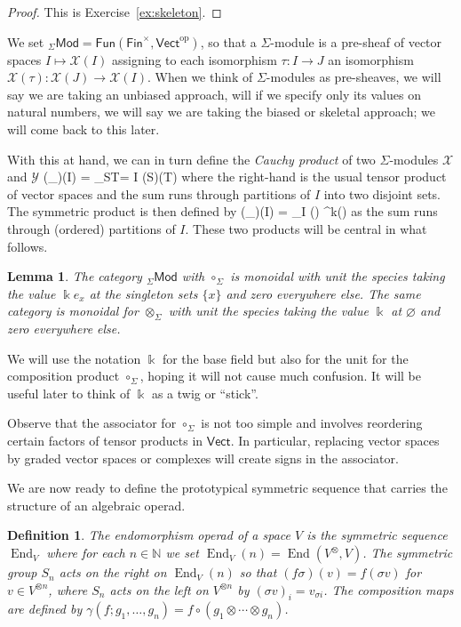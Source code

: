 \documentclass[fleqn, a4paper, twoside]{article}
\makeatletter
\newcommand{\0}{\langle 0\rangle}
\newcommand{\XX}{\mathcal{X}}
\newcommand{\YY}{\mathcal{Y}}
\newcommand{\End}{\operatorname{End}}
\let\[\@undefined
\DeclareRobustCommand{\[}{\begin{equation}}%
\let\]\@undefined
\DeclareRobustCommand{\]}{\end{equation}}%
\theoremstyle{mytheorem}
\newtheorem{lemma}[theorem]{Lemma}
\theoremstyle{introthm}
\theoremstyle{mydefinition}
\newtheorem{definition}[theorem]{Definition}
\theoremstyle{mydefinition2}
\theoremstyle{plain} %
\newcommand{\GSet}{\mathsf{Fin}^\times}
\newcommand{\Fun}{\mathsf{Fun}}
\newcommand{\Mod}{\mathsf{Mod}}
\newcommand{\?}{\,?\,}
\newcommand{\NN}{\mathbb N}
\newcommand{\kk}{\Bbbk}
\theoremstyle{mytheorem}
\theoremstyle{plain} %
\makeatother
\begin{document}
\begin{proof}
This is Exercise~\ref{ex:skeleton}.
\end{proof}

We set ${}_\Sigma\Mod  = 
\Fun(\GSet,\mathsf{Vect}^{\mathrm{op}})$,
so that a $\Sigma$-module is a pre-sheaf of vector
spaces $I\longmapsto \XX(I)$ assigning to each
isomorphism $\tau : I\longrightarrow J$ an isomorphism
$\XX(\tau): \XX(J)\longrightarrow \XX(I)$. When we
think of $\Sigma$-modules as pre-sheaves, we will say we 
are taking an unbiased approach, will if we specify only
its values on natural numbers, we will say we are taking the
biased or skeletal approach; we will come back to this later.

With this at hand, 
we can in turn define the \emph{Cauchy product}
of two $\Sigma$-modules $\XX$ and $\YY$
\[ (\XX\otimes_\Sigma \YY)(I) = 
 	\bigoplus_{S\sqcup T= I}
 		 \XX(S)\otimes \YY(T)\] 
where the right-hand is the usual tensor product of
vector spaces
and the sum runs through partitions of $I$ into
two disjoint sets. The symmetric product is then
defined by 
\[ (\XX\circ_\Sigma \YY)(I) 
 	= \bigoplus_{\pi \vdash I} \XX(\pi) 
 		\otimes \YY^{\otimes k}(\pi)\] 
as the sum runs through (ordered) partitions of $I$.
These two products will be central in what follows.

\begin{lemma}
The category ${}_\Sigma\Mod$ with $\circ_\Sigma$ is
monoidal with unit the species taking the value $\kk e_x$ at 
the singleton sets $\{x\}$ and zero everywhere else. The same
category is monoidal for $\otimes_\Sigma$ with unit
the species taking the value $\kk$ at $\varnothing$
and zero everywhere else.
\end{lemma}

We will use the notation $\kk$ for the base field but
also for the unit for the composition product $\circ_\Sigma$,
hoping it will not cause much confusion. It will be useful 
later to think of $\kk$ as a twig or ``stick''.

Observe that the associator for $\circ_\Sigma$ is
not too simple and involves reordering certain
factors of tensor products in $\mathsf{Vect}$. In
particular, replacing vector spaces by graded vector
spaces or complexes will create signs in the
associator.

We are now ready to define the prototypical symmetric
 sequence that carries the structure of an algebraic 
 operad. 
 
\begin{definition}
The \emph{endomorphism operad} of a space $V$ is the symmetric sequence $\End_V$
where for each $n\in\NN$ we set $\End_V(n) = \End(V^\otimes, V)$. 
The symmetric group $S_n$ acts on the right
on $\End_V(n)$ 
so that $(f\sigma)(v) = f(\sigma v)$ for
$v\in V^{\otimes n}$, where $S_n$ acts on
the left on $V^{\otimes n}$ by $(\sigma v)_i
= v_{\sigma i}$. The composition maps are defined
by $\gamma(f;g_1,\ldots,g_n) = f\circ (g_1\otimes\cdots \otimes g_n)$. 
\end{definition}
\end{document}
